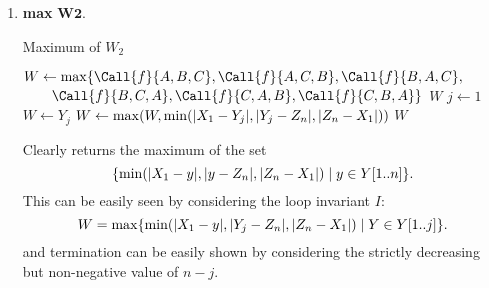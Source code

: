 \documentclass[12pt]{article}
\begin{document}
\begin{solution}
\begin{enumerate}[wide]
\begin{proof}
                Since \textsc{MinW2} calls \textsc{MinPair} $3$ times,
                the runtime of \textsc{MinW2} is $O(3n) = O(n)$.
            \end{proof}
        \item \textbf{max} $\bm{W2}$.
            \begin{algorithm}[H]
                \caption{Maximum of $W_2$}
                \begin{algorithmic}[1]
                        \State $W \gets \max\{\Call{f}{A, B, C}, \Call{f}{A, C, B}, \Call{f}{B, A, C},$
                        \Statex $\qquad\Call{f}{B, C, A}, \Call{f}{C, A, B}, \Call{f}{C, B, A}\}$
                        \State \Return $W$
                    \EndFunction
                        \State $j \gets 1$
                        \State $W \gets Y_j$
                            \State $W \gets \max(W, \min(\abs{X_1 - Y_{j}}, \abs{Y_{j} - Z_{n}}, \abs{Z_{n} - X_{1}}))$
                        \EndFor
                        \State \Return $W$
                    \EndFunction
                \end{algorithmic}
            \end{algorithm}
            Clearly  returns the maximum of the set \[
                \set{\min(\abs{X_1 - y}, \abs{y - Z_{n}}, \abs{Z_{n} - X_{1}}) \mid y \in Y[1..n]}.
            \] This can be easily seen by considering the loop invariant $I$: \[
                W = \max\set{\min(\abs{X_1 - y}, \abs{Y_{j} - Z_{n}}, \abs{Z_{n} - X_{1}}) \mid Y \in Y[1..j]}.
            \] and termination can be easily shown by considering the strictly
            decreasing but non-negative value of $n - j$.


\end{enumerate}
\end{solution}
\end{document}
